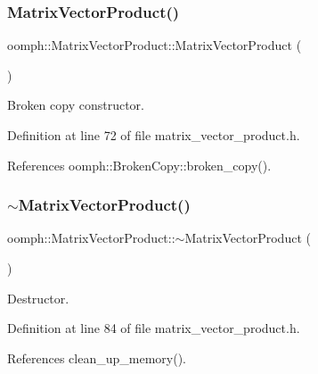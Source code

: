 \subsubsection{\texorpdfstring{Matrix\+Vector\+Product()}{MatrixVectorProduct()}\hspace{0.1cm}{\footnotesize\ttfamily [2/2]}}
{\footnotesize\ttfamily oomph\+::\+Matrix\+Vector\+Product\+::\+Matrix\+Vector\+Product (\begin{DoxyParamCaption}\item[{const \hyperlink{classoomph_1_1MatrixVectorProduct}{Matrix\+Vector\+Product} \&}]{ }\end{DoxyParamCaption})\hspace{0.3cm}{\ttfamily [inline]}}



Broken copy constructor. 



Definition at line 72 of file matrix\+\_\+vector\+\_\+product.\+h.



References oomph\+::\+Broken\+Copy\+::broken\+\_\+copy().

\mbox{\label{classoomph_1_1MatrixVectorProduct_add19a8ea5d1901423e334587446f55db}} 
\subsubsection{\texorpdfstring{$\sim$\+Matrix\+Vector\+Product()}{~MatrixVectorProduct()}}
{\footnotesize\ttfamily oomph\+::\+Matrix\+Vector\+Product\+::$\sim$\+Matrix\+Vector\+Product (\begin{DoxyParamCaption}{ }\end{DoxyParamCaption})\hspace{0.3cm}{\ttfamily [inline]}}



Destructor. 



Definition at line 84 of file matrix\+\_\+vector\+\_\+product.\+h.



References clean\+\_\+up\+\_\+memory().



